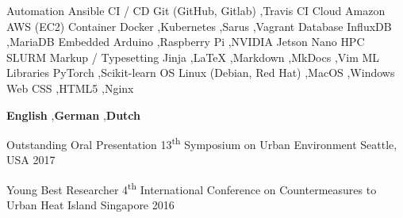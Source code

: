 \documentclass[11pt, a4paper]{preamble/awesome-cv-novo}
\begin{document}
\vspace{3mm}

  \begin{cvskills}

    \cvskill
      {Automation}
      {Ansible}
    \cvskill
      {CI / CD}
      {Git (GitHub, Gitlab) \sep Travis CI}
    \cvskill
      {Cloud}
      {Amazon AWS (EC2)}
    \cvskill
      {Container}
      {Docker \sep Kubernetes \sep Sarus \sep Vagrant}
    \cvskill
      {Database}
      {InfluxDB \sep MariaDB}
    \cvskill
      {Embedded}
      {Arduino \sep Raspberry Pi \sep NVIDIA Jetson Nano}
    \cvskill
      {HPC}
      {SLURM}
    \cvskill
      {Markup / Typesetting}
      {Jinja \sep LaTeX \sep Markdown \sep MkDocs \sep Vim}
    \cvskill
      {ML Libraries}
      {PyTorch \sep Scikit-learn}
    \cvskill
      {OS}
      {Linux (Debian, Red Hat) \sep MacOS \sep Windows}
    \cvskill
      {Web}
      {CSS \sep HTML5 \sep Nginx}
  \end{cvskills}



  \begin{cvlanguages}
      \cvlanguage
      {\textbf{English} \sep \textbf{German} \sep \textbf{Dutch}}
  \end{cvlanguages}



\begin{cvhonors}

  \cvhonor
    {Outstanding Oral Presentation} %
    {13\textsuperscript{th} Symposium on Urban Environment} %
    {Seattle, USA} %
    {2017} %

    \cvhonor
    {Young Best Researcher} %
    {4\textsuperscript{th} International Conference on Countermeasures to Urban Heat Island} %
    {Singapore} %
    {2016} %
\end{cvhonors}
\end{document}
